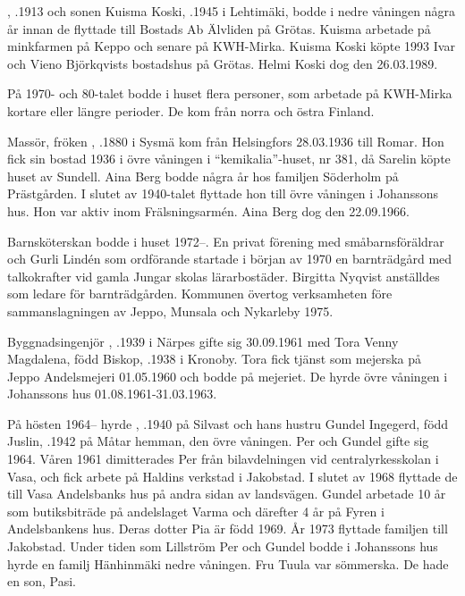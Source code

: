 , .1913 och sonen Kuisma Koski, .1945 i Lehtimäki,	bodde i nedre våningen några år innan de flyttade till Bostads Ab Älvliden på Grötas. Kuisma arbetade på minkfarmen på Keppo och senare på KWH-Mirka. Kuisma Koski köpte 	1993 Ivar och Vieno Björkqvists bostadshus på Grötas. Helmi Koski dog den 26.03.1989.

På 1970- och 80-talet bodde i huset flera personer, som arbetade på KWH-Mirka kortare eller längre perioder. De kom från norra och östra	Finland.

Massör, fröken , .1880 i Sysmä kom från Helsingfors 28.03.1936 till Romar. Hon fick sin bostad 1936 i övre våningen i ``kemikalia''-huset, nr 381, då Sarelin köpte huset av Sundell. Aina Berg bodde några år hos familjen Söderholm på Prästgården. I slutet av 1940-talet flyttade hon till övre våningen i Johanssons hus. Hon var aktiv inom Frälsningsarmén. Aina Berg dog den 22.09.1966.

Barnsköterskan  bodde i huset 1972--. En privat förening med småbarnsföräldrar och Gurli Lindén som ordförande startade i början av 1970 en barnträdgård med talkokrafter vid gamla Jungar skolas lärarbostäder. Birgitta Nyqvist anställdes som ledare för barnträdgården. Kommunen övertog verksamheten före sammanslagningen av Jeppo, Munsala och Nykarleby 1975.

Byggnadsingenjör , .1939 i Närpes gifte sig 30.09.1961 med Tora Venny Magdalena, född Biskop, .1938 i Kronoby. Tora fick tjänst som mejerska på Jeppo Andelsmejeri 01.05.1960 och bodde på mejeriet. De hyrde övre våningen i Johanssons hus 01.08.1961-31.03.1963.

På hösten 1964-- hyrde , .1940 på Silvast och hans hustru Gundel Ingegerd, född Juslin, .1942 på Måtar hemman, den övre våningen. Per och Gundel gifte sig 1964. Våren 1961 dimitterades Per från bilavdelningen vid centralyrkesskolan i Vasa, och fick arbete på Haldins verkstad i Jakobstad. I slutet av 1968 flyttade de till Vasa Andelsbanks hus på andra sidan av landsvägen. Gundel arbetade 10 år som butiksbiträde på andelslaget Varma och därefter 4 år på Fyren i Andelsbankens hus. Deras dotter Pia är född 1969.  År 1973 flyttade familjen till Jakobstad. Under tiden som Lillström Per och Gundel bodde i Johanssons hus hyrde en familj Hänhinmäki nedre våningen. Fru Tuula var sömmerska. De hade en son, Pasi.

